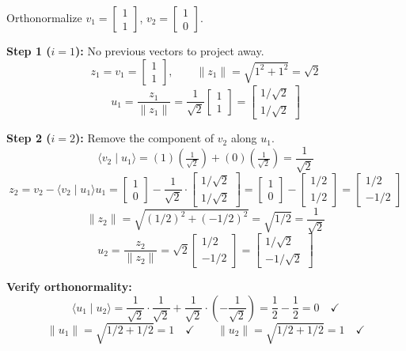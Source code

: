 \documentclass[11pt]{article}
\theoremstyle{definition}
\theoremstyle{plain}
\theoremstyle{remark}
\begin{document}
\begin{workedexample}[title=\textbf{Worked Example: Gram--Schmidt on two vectors in $\mathbb{R}^2$}]
Orthonormalize $v_1 = \begin{bmatrix}1\\1\end{bmatrix}$, $v_2 = \begin{bmatrix}1\\0\end{bmatrix}$.

\textbf{Step 1 ($i = 1$):} No previous vectors to project away.
\[
z_1 = v_1 = \begin{bmatrix}1\\1\end{bmatrix}, \qquad \|z_1\| = \sqrt{1^2 + 1^2} = \sqrt{2}
\]
\[
u_1 = \frac{z_1}{\|z_1\|} = \frac{1}{\sqrt{2}}\begin{bmatrix}1\\1\end{bmatrix} = \begin{bmatrix}1/\sqrt{2}\\1/\sqrt{2}\end{bmatrix}
\]

\textbf{Step 2 ($i = 2$):} Remove the component of $v_2$ along $u_1$.
\[
\langle v_2 \mid u_1 \rangle = (1)\!\left(\tfrac{1}{\sqrt{2}}\right) + (0)\!\left(\tfrac{1}{\sqrt{2}}\right) = \frac{1}{\sqrt{2}}
\]
\[
z_2 = v_2 - \langle v_2 \mid u_1 \rangle u_1 = \begin{bmatrix}1\\0\end{bmatrix} - \frac{1}{\sqrt{2}} \cdot \begin{bmatrix}1/\sqrt{2}\\1/\sqrt{2}\end{bmatrix} = \begin{bmatrix}1\\0\end{bmatrix} - \begin{bmatrix}1/2\\1/2\end{bmatrix} = \begin{bmatrix}1/2\\-1/2\end{bmatrix}
\]
\[
\|z_2\| = \sqrt{(1/2)^2 + (-1/2)^2} = \sqrt{1/2} = \frac{1}{\sqrt{2}}
\]
\[
u_2 = \frac{z_2}{\|z_2\|} = \sqrt{2}\begin{bmatrix}1/2\\-1/2\end{bmatrix} = \begin{bmatrix}1/\sqrt{2}\\-1/\sqrt{2}\end{bmatrix}
\]

\textbf{Verify orthonormality:}
\[
\langle u_1 \mid u_2 \rangle = \frac{1}{\sqrt{2}} \cdot \frac{1}{\sqrt{2}} + \frac{1}{\sqrt{2}} \cdot \left(-\frac{1}{\sqrt{2}}\right) = \frac{1}{2} - \frac{1}{2} = 0 \quad \checkmark
\]
\[
\|u_1\| = \sqrt{1/2 + 1/2} = 1 \quad \checkmark \qquad \|u_2\| = \sqrt{1/2 + 1/2} = 1 \quad \checkmark
\]
\end{workedexample}
\end{document}
